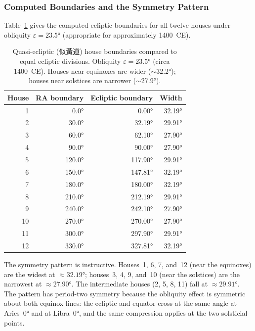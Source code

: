 \documentclass[10pt,a4paper]{article}
\newcommand{\zh}[1]{#1}
\providecommand{\degree}{\ensuremath{°}}
\begin{document}
\subsubsection*{Computed Boundaries and the Symmetry Pattern}

Table~\ref{tab:quasi-ecliptic} gives the computed ecliptic boundaries
for all twelve houses under obliquity $\varepsilon = 23.5\degree$
(appropriate for approximately 1400~CE).

\begin{table}[ht]
\centering
\caption{Quasi-ecliptic (\zh{似黃道}) house boundaries compared to equal ecliptic divisions. Obliquity $\varepsilon = 23.5\degree$ (circa 1400~CE). Houses near equinoxes are wider ($\sim$32.2\degree); houses near solstices are narrower ($\sim$27.9\degree).}
\label{tab:quasi-ecliptic}
\small
\begin{tabular}{@{}rrrr@{}}
\toprule
House & RA boundary & Ecliptic boundary & Width \\
\midrule
1 & 0.0\degree & 0.00\degree & 32.19\degree \\
2 & 30.0\degree & 32.19\degree & 29.91\degree \\
3 & 60.0\degree & 62.10\degree & 27.90\degree \\
4 & 90.0\degree & 90.00\degree & 27.90\degree \\
5 & 120.0\degree & 117.90\degree & 29.91\degree \\
6 & 150.0\degree & 147.81\degree & 32.19\degree \\
7 & 180.0\degree & 180.00\degree & 32.19\degree \\
8 & 210.0\degree & 212.19\degree & 29.91\degree \\
9 & 240.0\degree & 242.10\degree & 27.90\degree \\
10 & 270.0\degree & 270.00\degree & 27.90\degree \\
11 & 300.0\degree & 297.90\degree & 29.91\degree \\
12 & 330.0\degree & 327.81\degree & 32.19\degree \\
\bottomrule
\end{tabular}
\end{table}

The symmetry pattern is instructive.  Houses~1, 6, 7, and~12 (near
the equinoxes) are the widest at $\approx 32.19\degree$; houses~3,
4, 9, and~10 (near the solstices) are the narrowest at
$\approx 27.90\degree$.  The intermediate houses (2, 5, 8, 11) fall
at $\approx 29.91\degree$.  The pattern has period-two symmetry
because the obliquity effect is symmetric about both equinox lines:
the ecliptic and equator cross at the same angle at Aries~$0\degree$
and at Libra~$0\degree$, and the same compression applies at the two
solsticial points.
\end{document}
